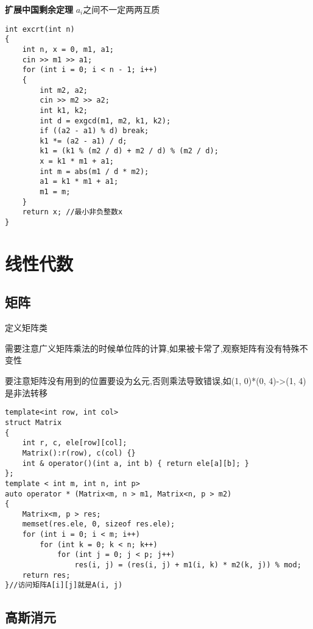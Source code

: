 \documentclass[a4paper, fontset=none]{ctexart}
\begin{document}
\textbf{扩展中国剩余定理} $a_i$之间不一定两两互质

\begin{verbatim}
int excrt(int n)
{
    int n, x = 0, m1, a1;
    cin >> m1 >> a1;
    for (int i = 0; i < n - 1; i++)
    {
        int m2, a2;
        cin >> m2 >> a2;
        int k1, k2;
        int d = exgcd(m1, m2, k1, k2);
        if ((a2 - a1) % d) break;
        k1 *= (a2 - a1) / d;
        k1 = (k1 % (m2 / d) + m2 / d) % (m2 / d);
        x = k1 * m1 + a1;
        int m = abs(m1 / d * m2);
        a1 = k1 * m1 + a1;
        m1 = m;
    }
    return x; //最小非负整数x
}
\end{verbatim}

\section{线性代数}
\subsection{矩阵}

定义矩阵类

需要注意广义矩阵乘法的时候单位阵的计算,如果被卡常了,观察矩阵有没有特殊不变性

要注意矩阵没有用到的位置要设为幺元,否则乘法导致错误,如(1, 0)*(0, 4)->(1, 4)是非法转移

\begin{verbatim}
template<int row, int col>
struct Matrix
{
    int r, c, ele[row][col];
    Matrix():r(row), c(col) {}
    int & operator()(int a, int b) { return ele[a][b]; }
};
template < int m, int n, int p>
auto operator * (Matrix<m, n > m1, Matrix<n, p > m2)
{
    Matrix<m, p > res;
    memset(res.ele, 0, sizeof res.ele);
    for (int i = 0; i < m; i++)
        for (int k = 0; k < n; k++)
            for (int j = 0; j < p; j++)
                res(i, j) = (res(i, j) + m1(i, k) * m2(k, j)) % mod;
    return res;
}//访问矩阵A[i][j]就是A(i, j)
\end{verbatim}
\subsection{高斯消元}
\end{document}
